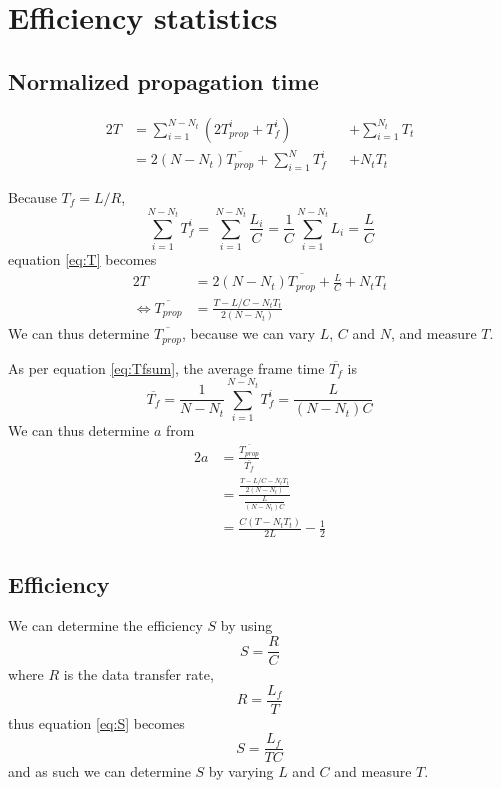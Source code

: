 \documentclass[a4paper, 11pt]{report}
\begin{document}
\chapter{Efficiency statistics}

\section{Normalized propagation time}

\begin{alignat}{2} \label{eq:T}
	T & = \sum_{i=1}^{N-N_t}{(2T_{prop}^i + T_f^i)} && + \sum_{i=1}^{N_t}{T_t} \\
	  & = 2 (N-N_t) \overline{T_{prop}} + \sum_{i=1}^{N}{T_f^i} && + N_t T_t
\end{alignat}

Because $T_f = L/R$,
\begin{equation} \label{eq:Tfsum}
	\sum_{i=1}^{N-N_t}{T_f^i} = \sum_{i=1}^{N-N_t}{\frac{L_i}{C}} = \frac{1}{C} \sum_{i=1}^{N-N_t}{L_i} = \frac{L}{C}
\end{equation}
equation \ref{eq:T} becomes
\begin{alignat}{2} \label{eq:T2}
	T & = 2 (N-N_t) \overline{T_{prop}} + \frac{L}{C} + N_t T_t \\
	\iff \overline{T_{prop}} & = \frac{T - L/C - N_t T_t}{2 (N-N_t)}
\end{alignat}
We can thus determine $\overline{T_{prop}}$, because we can vary $L$, $C$ and $N$, and measure $T$.

As per equation \ref{eq:Tfsum}, the average frame time $\overline{T_f}$ is 
\begin{equation} \label{eq:Tfmean}
	\overline{T_f} = \frac{1}{N-N_t}\sum_{i=1}^{N-N_t}{T_f^i} = \frac{L}{(N-N_t) C}
\end{equation}
We can thus determine $a$ from
\begin{alignat}{2}
	a
	& = \frac{\overline{T_{prop}}}{\overline{T_f}} \\
	& = \frac{\frac{T - L/C - N_t T_t}{2 (N-N_t)}}{\frac{L}{(N-N_t) C}} \\
	& = \frac{C(T - N_t T_t)}{2 L} - \frac{1}{2}
\end{alignat}

\section{Efficiency}

We can determine the efficiency $S$ by using 
\begin{equation} \label{eq:S}
	S = \frac{R}{C}
\end{equation}
where $R$ is the data transfer rate,
\begin{equation} \label{eq:R}
	R = \frac{L_f}{T}
\end{equation}
thus equation \ref{eq:S} becomes
\begin{equation} \label{eq:S2}
	S = \frac{L_f}{T C}
\end{equation}
and as such we can determine $S$ by varying $L$ and $C$ and measure $T$.
\end{document}
